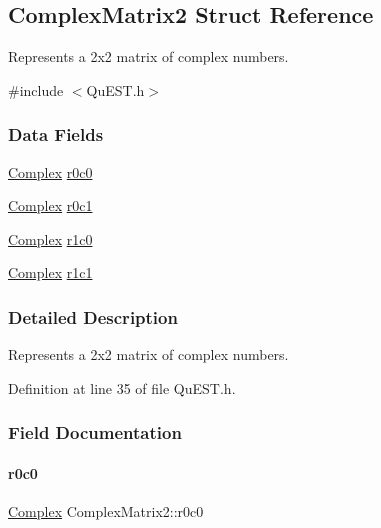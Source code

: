 \hypertarget{structComplexMatrix2}{}\subsection{Complex\+Matrix2 Struct Reference}
\label{structComplexMatrix2}


Represents a 2x2 matrix of complex numbers.  




{\ttfamily \#include $<$Qu\+E\+S\+T.\+h$>$}

\subsubsection*{Data Fields}
\begin{DoxyCompactItemize}
\item 
\mbox{\hyperlink{structComplex}{Complex}} \mbox{\hyperlink{structComplexMatrix2_ae72b4458233b077a636beee1892e81ff}{r0c0}}
\item 
\mbox{\hyperlink{structComplex}{Complex}} \mbox{\hyperlink{structComplexMatrix2_a0f3932f055a8b05cef361bce25d51172}{r0c1}}
\item 
\mbox{\hyperlink{structComplex}{Complex}} \mbox{\hyperlink{structComplexMatrix2_ab98282015ed2065e53fbc9638e2583ab}{r1c0}}
\item 
\mbox{\hyperlink{structComplex}{Complex}} \mbox{\hyperlink{structComplexMatrix2_a763007c3070802373549ba0350f83c8a}{r1c1}}
\end{DoxyCompactItemize}


\subsubsection{Detailed Description}
Represents a 2x2 matrix of complex numbers. 

Definition at line 35 of file Qu\+E\+S\+T.\+h.



\subsubsection{Field Documentation}
\mbox{\label{structComplexMatrix2_ae72b4458233b077a636beee1892e81ff}} 
\paragraph{\texorpdfstring{r0c0}{r0c0}}
{\footnotesize\ttfamily \mbox{\hyperlink{structComplex}{Complex}} Complex\+Matrix2\+::r0c0}



